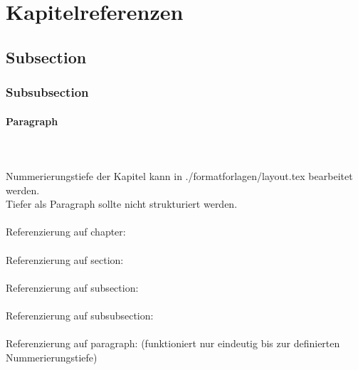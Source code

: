 %
\section{Kapitelreferenzen}\label{sec:kapitelreferenzen}
%
\subsection{Subsection}\label{subsec:subsection}
%
\subsubsection{Subsubsection}\label{subsubsec:subsubsection}
%
\paragraph{Paragraph}\label{paragraph:paragraph}
$\;$ \\ %
\\
Nummerierungstiefe der Kapitel kann in ./formatforlagen/layout.tex bearbeitet werden.\\
Tiefer als Paragraph sollte nicht strukturiert werden.\\\\
%
Referenzierung auf chapter: \\\\
Referenzierung auf section: \\\\
Referenzierung auf subsection: \\\\
Referenzierung auf subsubsection: \\\\
Referenzierung auf paragraph:  (funktioniert nur eindeutig bis zur definierten Nummerierungstiefe)\\\\
%
\newpage
%
